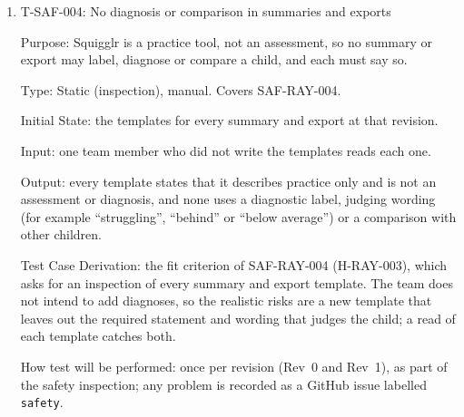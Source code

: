 \documentclass[12pt, titlepage]{article}
\newcommand{\testitem}[1]{\item #1\par\nopagebreak}
\begin{document}
\begin{enumerate}
Type: Dynamic, automatic. Covers SAF-RAY-003 and SAF-SHA-003.

Initial State: a guided lesson is open and online.

Input: (a) the connection is cut during an attempt; (b) the connection is cut
after the attempt is finished but before the server confirms the save, and
the page is then reloaded, and separately closed and reopened, while
offline; (c) the server returns an error for \texttt{FAILED\_SAVES} saves in
a row; (d) \texttt{FAILED\_SAVES} saves succeed normally.

Output: in (a) to (c), no attempt is shown as saved before the server
confirms it, the adult is told which attempts are not saved, and every
attempt is saved once the connection or server is back; in (d), no failure
message appears.

Test Case Derivation: SAF-RAY-003 and SAF-SHA-003 (H-RAY-002, H-SHA-003).
Case (d) checks that the warning does not appear when nothing failed.

How test will be performed: Playwright turns the network off and makes the
server return errors, then compares the server's records with the attempts
made.

\testitem{T-SAF-004: No diagnosis or comparison in summaries and exports}

Purpose: Squigglr is a practice tool, not an assessment, so no summary or
export may label, diagnose or compare a child, and each must say so.

Type: Static (inspection), manual. Covers SAF-RAY-004.

Initial State: the templates for every summary and export at that revision.

Input: one team member who did not write the templates reads each one.

Output: every template states that it describes practice only and is not an
assessment or diagnosis, and none uses a diagnostic label, judging wording
(for example ``struggling'', ``behind'' or ``below average'') or a comparison
with other children.

Test Case Derivation: the fit criterion of SAF-RAY-004 (H-RAY-003), which
asks for an inspection of every summary and export template. The team does
not intend to add diagnoses, so the realistic risks are a new template that
leaves out the required statement and wording that judges the child; a read
of each template catches both.

How test will be performed: once per revision (Rev~0 and Rev~1), as part of
the safety inspection; any problem is recorded as a GitHub issue labelled
\texttt{safety}.


\end{enumerate}
\end{document}
